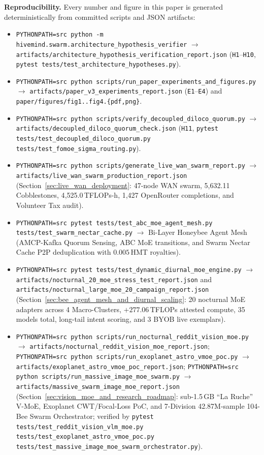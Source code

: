 \documentclass[11pt,a4paper]{article}
\begin{document}
\textbf{Reproducibility.} Every number and figure in this paper is generated deterministically from committed scripts and JSON artifacts:
\begin{itemize}[leftmargin=1.8em]
    \item \texttt{PYTHONPATH=src python -m hivemind.swarm.architecture\_hypothesis\_verifier} $\to$ \texttt{artifacts/architecture\_hypothesis\_verification\_report.json} (\texttt{H1}--\texttt{H10}, \texttt{pytest tests/test\_architecture\_hypotheses.py}).
    \item \texttt{PYTHONPATH=src python scripts/run\_paper\_experiments\_and\_figures.py} $\to$ \texttt{artifacts/paper\_v3\_experiments\_report.json} (\texttt{E1}--\texttt{E4}) and \texttt{paper/figures/fig1..fig4.\{pdf,png\}}.
    \item \texttt{PYTHONPATH=src python scripts/verify\_decoupled\_diloco\_quorum.py} $\to$ \texttt{artifacts/decoupled\_diloco\_quorum\_check.json} (\texttt{H11}, \texttt{pytest tests/test\_decoupled\_diloco\_quorum.py tests/test\_fomoe\_sigma\_routing.py}).
    \item \texttt{PYTHONPATH=src python scripts/generate\_live\_wan\_swarm\_report.py} $\to$ \texttt{artifacts/live\_wan\_swarm\_production\_report.json} (Section~\ref{sec:live_wan_deployment}: 47-node WAN swarm, 5{,}632.11 Cobblestones, 4{,}525.0\,TFLOPs-h, 1{,}427 OpenRouter completions, and Volunteer Tax audit).
    \item \texttt{PYTHONPATH=src pytest tests/test\_abc\_moe\_agent\_mesh.py tests/test\_swarm\_nectar\_cache.py} $\to$ Bi-Layer Honeybee Agent Mesh (AMCP-Kafka Quorum Sensing, ABC MoE transitions, and Swarm Nectar Cache P2P deduplication with $0.005$\,HMT royalties).
    \item \texttt{PYTHONPATH=src pytest tests/test\_dynamic\_diurnal\_moe\_engine.py} $\to$ \texttt{artifacts/nocturnal\_20\_moe\_stress\_test\_report.json} and \texttt{artifacts/nocturnal\_large\_moe\_20\_campaign\_report.json} (Section~\ref{sec:bee_agent_mesh_and_diurnal_scaling}: 20 nocturnal MoE adapters across 4 Macro-Clusters, $+277.06$\,TFLOPs attested compute, 35 models total, long-tail intent scoring, and 3 BYOB live exemplars).
    \item \texttt{PYTHONPATH=src python scripts/\allowbreak run\_nocturnal\_\allowbreak reddit\_vision\_moe.py} $\to$ \texttt{artifacts/\allowbreak nocturnal\_reddit\_\allowbreak vision\_moe\_\allowbreak report.json}; \texttt{PYTHONPATH=src python scripts/\allowbreak run\_exoplanet\_\allowbreak astro\_vmoe\_poc.py} $\to$ \texttt{artifacts/\allowbreak exoplanet\_astro\_\allowbreak vmoe\_poc\_\allowbreak report.json}; \texttt{PYTHONPATH=src python scripts/\allowbreak run\_massive\_\allowbreak image\_moe\_swarm.py} $\to$ \texttt{artifacts/\allowbreak massive\_swarm\_\allowbreak image\_moe\_\allowbreak report.json} (Section~\ref{sec:vision_moe_and_research_roadmap}: sub-1.5\,GB ``La Ruche'' V-MoE, Exoplanet CWT/Focal-Loss PoC, and 7-Division 42.87M-sample 104-Bee Swarm Orchestrator; verified by \texttt{pytest tests/\allowbreak test\_reddit\_\allowbreak vision\_vlm\_moe.py tests/\allowbreak test\_exoplanet\_\allowbreak astro\_vmoe\_poc.py tests/\allowbreak test\_massive\_\allowbreak image\_moe\_swarm\_\allowbreak orchestrator.py}).

\end{itemize}
\end{document}
